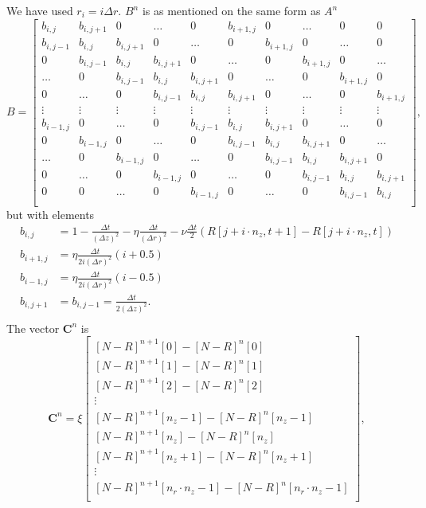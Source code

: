 \documentclass{article}
\begin{document}
We have used $r_i = i \Delta r$. $B^n$ is as mentioned on the same form as $A^n$ 
\begin{equation}
B = 
    \begin{bmatrix}
    b_{i,j} & b_{i,j+1} & 0 & \hdots & 0 & b_{i+1,j} & 0 & \hdots & 0 &  0 \\
    b_{i,j-1} & b_{i,j} & b_{i,j+1} & 0 & \hdots & 0 & b_{i+1,j} & 0 & \hdots & 0 \\
    0 & b_{i,j-1} & b_{i,j} & b_{i,j+1} & 0 & \hdots & 0  & b_{i+1,j} & 0 & \hdots \\
    \hdots & 0 & b_{i,j-1} & b_{i,j} & b_{i,j+1} & 0 & \hdots & 0  & b_{i+1,j} & 0 \\
    0 & \hdots & 0 & b_{i,j-1} & b_{i,j} & b_{i,j+1} & 0 & \hdots & 0  & b_{i+1,j}  \\
    \vdots & \vdots & \vdots &\vdots &\vdots &\vdots &\vdots &\vdots &\vdots &\vdots \\
    b_{i-1,j} & 0 & \hdots & 0 & b_{i,j-1} & b_{i,j} & b_{i,j+1} & 0 & \hdots & 0  \\
    0 & b_{i-1,j} & 0 & \hdots & 0 & b_{i,j-1} & b_{i,j} & b_{i,j+1} & 0 & \hdots \\
    \hdots & 0 & b_{i-1,j} & 0 & \hdots & 0 & b_{i,j-1} & b_{i,j} &  b_{i,j+1} & 0 \\
    0 & \hdots & 0 & b_{i-1,j} & 0 & \hdots & 0 & b_{i,j-1} & b_{i,j} &  b_{i,j+1} \\
    0 & 0 &  \hdots & 0 & b_{i-1,j} & 0 & \hdots & 0 & b_{i,j-1} & b_{i,j} \\
    \end{bmatrix},
\end{equation}
but with elements
\begin{align*}
    b_{i,j} &= 1 - \frac{\Delta t}{(\Delta z)^2} - \eta \frac{\Delta t}{(\Delta r)^2}  - \nu \frac{\Delta t }{2}(R[j + i \cdot n_z,t+1]-R[j + i \cdot n_z,t]) \\
    b_{i+1,j} &=  \eta \frac{\Delta t}{2 i (\Delta r)^2} (i+0.5) \\
    b_{i-1,j} &=  \eta \frac{\Delta t}{2 i (\Delta r)^2} (i-0.5) \\
    b_{i,j+1} &= b_{i,j-1} = \frac{\Delta t }{2 (\Delta z)^2}.\\
\end{align*}
The vector $\boldsymbol{C}^n$ is 
\begin{equation}
\boldsymbol{C}^n = \xi
    \begin{bmatrix}
        [N-R]^{n+1}[0]-[N-R]^{n}[0] \\
        [N-R]^{n+1}[1]-[N-R]^{n}[1] \\
        [N-R]^{n+1}[2]-[N-R]^{n}[2] \\
        \vdots \\
        [N-R]^{n+1}[n_z-1]-[N-R]^{n}[n_z-1] \\
        [N-R]^{n+1}[n_z]-[N-R]^{n}[n_z] \\
        [N-R]^{n+1}[n_z+1]-[N-R]^{n}[n_z+1] \\
        \vdots \\
        [N-R]^{n+1}[n_r \cdot n_z-1]-[N-R]^{n}[n_r \cdot n_z-1] \\
    \end{bmatrix},
\end{equation}
\end{document}
